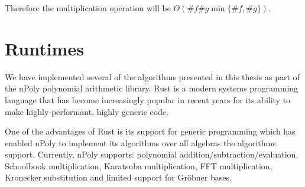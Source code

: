 Therefore the multiplication operation will be $O(\# f \# g \min\{\# f, \# g\})$.





\section{Runtimes}

We have implemented several of the algorithms presented in this thesis as part of the nPoly polynomial arithmetic library. Rust is a modern systems programming language that has become increasingly popular in recent years for its ability to make highly-performant, highly generic code.

One of the advantages of Rust is its support for generic programming which has enabled nPoly to implement its algorithms over all algebras the algorithms support. Currently, nPoly supports: polynomial addition/subtraction/evaluation, Schoolbook multiplication, Karatsuba multiplication, FFT multiplication, Kronecker substitution and limited support for Gr\"{o}bner bases.



